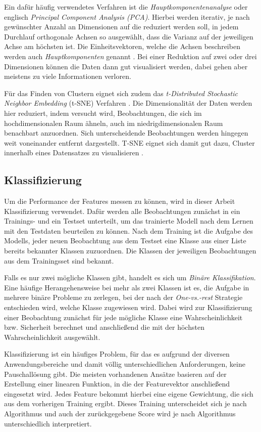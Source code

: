 Ein dafür häufig verwendetes Verfahren ist die \emph{Hauptkomponentenanalyse} oder englisch \emph{Principal Component Analysis (PCA)}. Hierbei werden iterativ, je nach gewünschter Anzahl an Dimensionen auf die reduziert werden soll, in jedem Durchlauf orthogonale Achsen so ausgewählt, dass die Varianz auf der jeweiligen Achse am höchsten ist. Die Einheitsvektoren, welche die Achsen beschreiben werden auch \textit{Hauptkomponenten} genannt \cite[S.213-214]{geron2017hands}. Bei einer Reduktion auf zwei oder drei Dimensionen können die Daten dann gut visualisiert werden, dabei gehen aber meistens zu viele Informationen verloren.

Für das Finden von Clustern eignet sich zudem das \textit{t-Distributed Stochastic Neighbor Embedding} (t-SNE) Verfahren \cite{maaten2008visualizing}. Die Dimensionalität der Daten werden hier reduziert, indem versucht wird, Beobachtungen, die sich im hochdimensionalen Raum ähneln, auch im niedrigdimensionalen Raum benachbart anzuordnen. Sich unterscheidende Beobachtungen werden hingegen weit voneinander entfernt dargestellt. T-SNE eignet sich damit gut dazu, Cluster innerhalb eines Datensatzes zu visualisieren \cite[S.~226]{geron2017hands}.

\subsection{Klassifizierung}
Um die Performance der Features messen zu können, wird in dieser Arbeit Klassifizierung verwendet. Dafür werden alle Beobachtungen zunächst in ein Trainings- und ein Testset unterteilt, um das trainierte Modell nach dem Lernen mit den Testdaten beurteilen zu können. Nach dem Training ist die Aufgabe des Modells, jeder neuen Beobachtung aus dem Testset eine Klasse aus einer Liste bereits bekannter Klassen zuzuordnen. Die Klassen der jeweiligen Beobachtungen aus dem Trainingsset sind bekannt.

Falls es nur zwei mögliche Klassen gibt, handelt es sich um \emph{Binäre Klassifikation}. Eine häufige Herangehensweise bei mehr als zwei Klassen ist es, die Aufgabe in mehrere binäre Probleme zu zerlegen, bei der nach der \emph{One-vs.-rest} Strategie entschieden wird, welche Klasse zugewiesen wird. Dabei wird zur Klassifizierung einer Beobachtung zunächst für jede mögliche Klasse eine Wahrscheinlichkeit bzw. Sicherheit berechnet und anschließend die mit der höchsten Wahrscheinlichkeit ausgewählt.

Klassifizierung ist ein häufiges Problem, für das es aufgrund der diversen Anwendungsbereiche und damit völlig unterschiedlichen Anforderungen, keine Pauschallösung gibt. Die meisten vorhandenen Ansätze basieren auf der Erstellung einer linearen Funktion, in die der Featurevektor anschließend eingesetzt wird. Jedes Feature bekommt hierbei eine eigene Gewichtung, die sich aus dem vorherigen Training ergibt. Dieses Training unterscheidet sich je nach Algorithmus und auch der zurückgegebene Score wird je nach Algorithmus unterschiedlich interpretiert.

